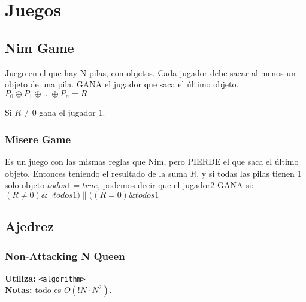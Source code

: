 \section{Juegos}
\subsection{Nim Game}
Juego en el que hay N pilas, con objetos. Cada jugador debe sacar al menos un objeto de una pila. GANA el jugador que saca el \'ultimo objeto.
$P_0{\oplus}P_1{\oplus}...{\oplus}P_n = R$

Si $R{\neq}0$ gana el jugador 1.
\subsubsection{Misere Game}
Es un juego con las mismas reglas que Nim, pero PIERDE el que saca el \'ultimo objeto. Entonces teniendo el resultado de la suma $R$, y 
si todas las pilas tienen 1 solo objeto $todos1{=}true$, podemos decir que el jugador2 GANA si:
${(R{\neq}0){\&}{\neg}{todos1}){\parallel}((R{=}0 ){\&}{todos1}}$
\subsection{Ajedrez}
\subsubsection{Non-Attacking N Queen}
\begin{footnotesize}
	\textbf{Utiliza:} \texttt{<algorithm>}\\
	\textbf{Notas:} todo es $ O(!N \cdot N^{2})$.
\end{footnotesize}

